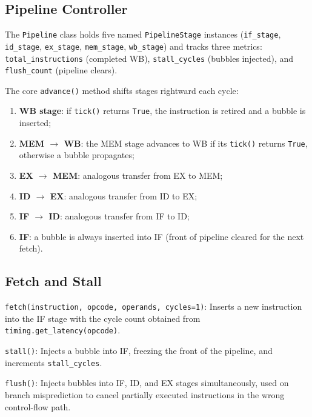 \documentclass[10pt,a4paper,twoside]{book}
\begin{document}
\subsection{Pipeline Controller}

The \texttt{Pipeline} class holds five named \texttt{PipelineStage} instances
(\texttt{if\_stage}, \texttt{id\_stage}, \texttt{ex\_stage},
\texttt{mem\_stage}, \texttt{wb\_stage}) and tracks three metrics:
\texttt{total\_instructions} (completed WB), \texttt{stall\_cycles} (bubbles
injected), and \texttt{flush\_count} (pipeline clears).

The core \texttt{advance()} method shifts stages rightward each cycle:

\begin{enumerate}
    \item \textbf{WB stage}: if \texttt{tick()} returns \texttt{True}, the
          instruction is retired and a bubble is inserted;
    \item \textbf{MEM $\rightarrow$ WB}: the MEM stage advances to WB if its
          \texttt{tick()} returns \texttt{True}, otherwise a bubble propagates;
    \item \textbf{EX $\rightarrow$ MEM}: analogous transfer from EX to MEM;
    \item \textbf{ID $\rightarrow$ EX}: analogous transfer from ID to EX;
    \item \textbf{IF $\rightarrow$ ID}: analogous transfer from IF to ID;
    \item \textbf{IF}: a bubble is always inserted into IF (front of pipeline
          cleared for the next fetch).
\end{enumerate}

\subsection{Fetch and Stall}

\noindent\texttt{fetch(instruction, opcode, operands, cycles=1)}: Inserts a
new instruction into the IF stage with the cycle count obtained from
\texttt{timing.get\_latency(opcode)}.

\noindent\texttt{stall()}: Injects a bubble into IF, freezing the front of
the pipeline, and increments \texttt{stall\_cycles}.

\noindent\texttt{flush()}: Injects bubbles into IF, ID, and EX stages
simultaneously, used on branch misprediction to cancel partially executed
instructions in the wrong control-flow path.
\end{document}
